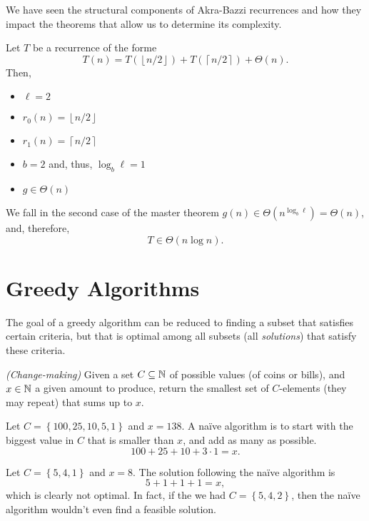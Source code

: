 
\begin{previouslyseen}
    We have seen the structural components of Akra-Bazzi recurrences and how they impact the theorems that allow us to determine its complexity.
\end{previouslyseen}

\begin{eg}
    Let $T$ be a recurrence of the forme \[
    T(n) = T(\left\lfloor n / 2 \right\rfloor) + T(\left\lceil n / 2 \right\rceil ) + \Theta(n)
    .\] Then,
    \begin{itemize}
        \item $\ell = 2$ 
	\item $r_0(n)=\left\lfloor n / 2 \right\rfloor$ 
	\item $r_1(n) = \left\lceil n / 2 \right\rceil $
	\item $b=2$ and, thus, $\log_b \ell = 1$ 
	\item $g\in \Theta(n)$
    \end{itemize}

    We fall in the second case of the master theorem $g(n) \in \Theta(n^{\log_b \ell})=\Theta(n)$, and, therefore, \[
    T \in  \Theta(n \log n)
    .\] 
\end{eg}

\section*{Greedy Algorithms}

The goal of a greedy algorithm can be reduced to finding a subset that satisfies certain criteria, but that is optimal among all subsets (all \emph{solutions}) that satisfy these criteria.

\begin{problem}
    \emph{(Change-making)}
    Given a set $C\subseteq\mathbb{N}$ of possible values (of coins or bills), and $x\in \mathbb{N}$ a given amount to produce, return the smallest set of $C$-elements (they may repeat) that sums up to $x$.
\end{problem}

\begin{eg}
    Let $C=\left\{ 100,25,10,5,1 \right\} $ and $x=138$.
    A naïve algorithm is to start with the biggest value in $C$ that is smaller than $x$, and add as many as possible. \[
    100 + 25 + 10 + 3\cdot 1 = x
    .\] 

    Let $C=\left\{ 5,4,1 \right\} $ and $x=8$.
    The solution following the naïve algorithm is \[
    5 + 1 + 1 + 1 = x
    ,\] which is clearly not optimal.
    In fact, if the we had $C=\left\{ 5,4,2 \right\} $, then the naïve algorithm wouldn't even find a feasible solution.
\end{eg}

